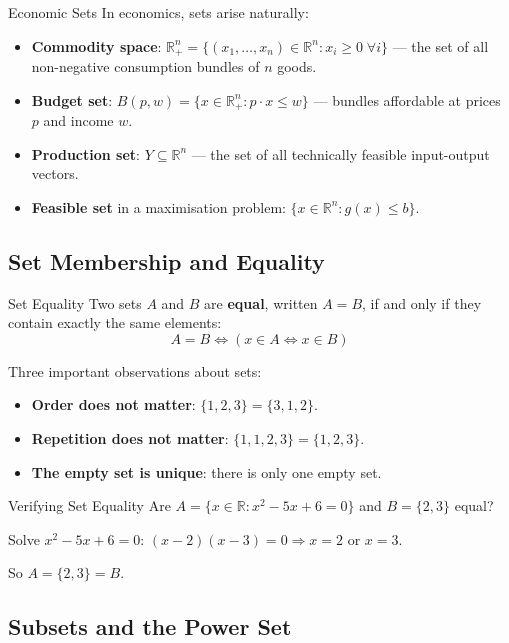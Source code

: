 \documentclass[12pt, a4paper]{article}
\theoremstyle{definition}
\newcommand{\R}{\mathbb{R}}
\begin{document}
\begin{exbox}{Economic Sets}
In economics, sets arise naturally:
\begin{itemize}
  \item \textbf{Commodity space}: $\R^n_+ = \{(x_1,\ldots,x_n) \in \R^n : x_i \geq 0\;\forall i\}$ --- the set of all non-negative consumption bundles of $n$ goods.
  \item \textbf{Budget set}: $B(p,w) = \{x \in \R^n_+ : p \cdot x \leq w\}$ --- bundles affordable at prices $p$ and income $w$.
  \item \textbf{Production set}: $Y \subseteq \R^n$ --- the set of all technically feasible input-output vectors.
  \item \textbf{Feasible set} in a maximisation problem: $\{x \in \R^n : g(x) \leq b\}$.
\end{itemize}
\end{exbox}

\subsection{Set Membership and Equality}

\begin{defbox}{Set Equality}
Two sets $A$ and $B$ are \textbf{equal}, written $A = B$, if and only if they contain exactly the same elements:
\[
  A = B \iff (x \in A \iff x \in B)
\]
\end{defbox}

Three important observations about sets:
\begin{itemize}
  \item \textbf{Order does not matter}: $\{1,2,3\} = \{3,1,2\}$.
  \item \textbf{Repetition does not matter}: $\{1,1,2,3\} = \{1,2,3\}$.
  \item \textbf{The empty set is unique}: there is only one empty set.
\end{itemize}

\begin{exbox}{Verifying Set Equality}
Are $A = \{x \in \R : x^2 - 5x + 6 = 0\}$ and $B = \{2, 3\}$ equal?

Solve $x^2 - 5x + 6 = 0$: $(x-2)(x-3) = 0 \Rightarrow x = 2$ or $x = 3$.

So $A = \{2, 3\} = B$. \checkmark
\end{exbox}

\subsection{Subsets and the Power Set}
\end{document}
